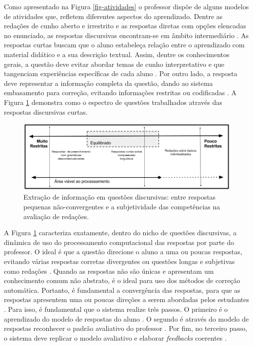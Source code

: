 Como apresentado na Figura \ref{fig-atividades} o professor dispõe de alguns modelos de atividades que, refletem diferentes aspectos do aprendizado. Dentre as redações de cunho aberto e irrestrito e as respostas diretas com opções elencadas no enunciado, as respostas discursivas encontram-se em âmbito intermediário \cite{bailey2008}. As respostas curtas buscam que o aluno estabeleça relação entre o aprendizado com material didático e a sua descrição textual. Assim, dentre os conhecimentos gerais, a questão deve evitar abordar temas de cunho interpretativo e que tangenciam experiências específicas de cada aluno \cite{siddiqi2008}. Por outro lado, a resposta deve representar a informação completa da questão, dando ao sistema embasamento para correção, evitando informações restritas ou codificadas \cite{ding2020}. A Figura \ref{fig-SAG-concepts} demonstra como o espectro de questões trabalhados através das respostas discursivas curtas.


\begin{figure}[h]
\begin{center}
\includegraphics[width=\textwidth]{figuras/aprendizadoSAG}
\caption{Extração de informação em questões discursivas: entre respostas pequenas não-convergentes e a subjetividade das competências na avaliação de redações.}
\label{fig-SAG-concepts}
\end{center}
\end{figure}


A Figura \ref{fig-SAG-concepts} caracteriza exatamente, dentro do nicho de questões discursivas, a dinâmica de uso do processamento computacional das respostas por parte do professor. O ideal é que a questão direcione o aluno a uma ou poucas respostas, evitando várias respostas corretas divergentes \cite{suzen2020} ou questões longas e subjetivas como redações \cite{almeida-junior2017}. Quando as respostas não são únicas e apresentam um conhecimento comum não abstrato, é o ideal para uso dos métodos de correção automática. Portanto, é fundamental a convergência das respostas, para que as respostas apresentem uma ou poucas direções a serem abordadas pelos estudantes \cite{filighera2020}. Para isso, é fundamental que o sistema realize três passos. O primeiro é o aprendizado do modelo de respostas do aluno \cite{ramachandran2015b}. O segundo é através do modelo de respostas reconhecer o padrão avaliativo do professor \cite{funayama2020}. Por fim, no terceiro passo, o sistema deve replicar o modelo avaliativo e elaborar \textit{feedbacks} coerentes \cite{fowler2021}.

